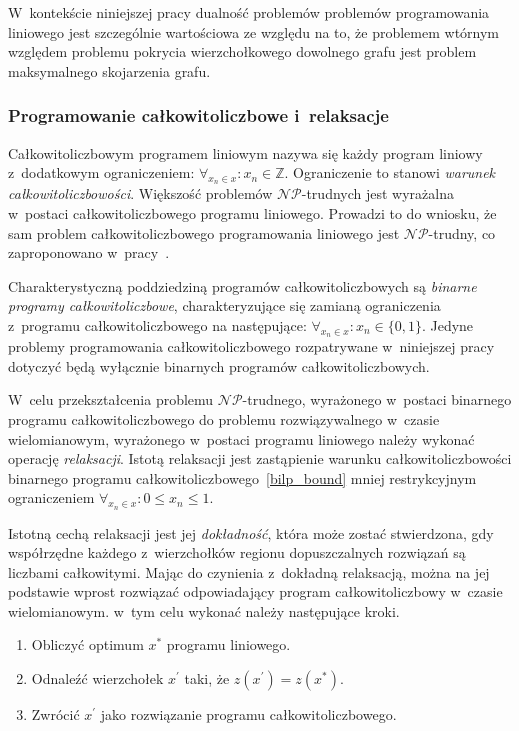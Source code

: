 \par{
  W~kontekście niniejszej pracy dualność problemów problemów programowania
  liniowego jest szczególnie wartościowa ze względu na to, że problemem
  wtórnym względem problemu pokrycia wierzchołkowego dowolnego grafu jest 
  problem maksymalnego skojarzenia grafu.
}

\subsubsection{\textbf{Programowanie całkowitoliczbowe i~relaksacje}}
\label{sss_ilp_relaxations}
\par{
  Całkowitoliczbowym programem liniowym nazywa się każdy program liniowy 
  z~dodatkowym ograniczeniem: $\forall_{x_n \in x}: x_n \in
  \mathbb{Z}$\label{ilp_bound}.
  Ograniczenie to stanowi \emph{warunek całkowitoliczbowości}.
  Większość problemów $\mathcal{NP}$-trudnych jest wyrażalna w~postaci całkowitoliczbowego programu liniowego.
  Prowadzi to do wniosku, że sam problem całkowitoliczbowego programowania liniowego jest $\mathcal{NP}$-trudny, co zaproponowano w~pracy~\cite{Kar72}.
}
\par{  
  Charakterystyczną poddziedziną programów całkowitoliczbowych są
  \emph{binarne programy całkowitoliczbowe}, charakteryzujące się zamianą
  ograniczenia z~programu całkowitoliczbowego na następujące:
  $\forall_{x_n \in x}: x_n \in \{0, 1\}\label{bilp_bound}$.
  Jedyne problemy programowania całkowitoliczbowego rozpatrywane w~niniejszej
  pracy dotyczyć będą wyłącznie binarnych programów całkowitoliczbowych.
}
\par{
  W~celu przekształcenia problemu $\mathcal{NP}$-trudnego, wyrażonego w~postaci binarnego programu całkowitoliczbowego do problemu rozwiązywalnego w~czasie wielomianowym, wyrażonego w~postaci programu liniowego należy wykonać operację \emph{relaksacji}.
  Istotą relaksacji jest zastąpienie warunku całkowitoliczbowości binarnego
  programu całkowitoliczbowego~\eqref{bilp_bound} mniej restrykcyjnym ograniczeniem $\forall_{x_n\in x}: 0\leq x_n\leq 1$.
}
\par {
  Istotną cechą relaksacji jest jej \emph{dokładność}, która może zostać
  stwierdzona, gdy współrzędne każdego z~wierzchołków regionu dopuszczalnych 
  rozwiązań są liczbami całkowitymi.
  Mając do czynienia z~dokładną relaksacją, można na jej podstawie wprost 
  rozwiązać odpowiadający program całkowitoliczbowy w~czasie wielomianowym.
  w~tym celu wykonać należy następujące kroki.
  \begin{enumerate}
    \item Obliczyć optimum $x^*$ programu liniowego.
    \item Odnaleźć wierzchołek $x^{\prime}$ taki, że $z(x^{\prime})=z(x^*)$.
    \item Zwrócić $x^{\prime}$ jako rozwiązanie programu całkowitoliczbowego.
  \end{enumerate}
}

